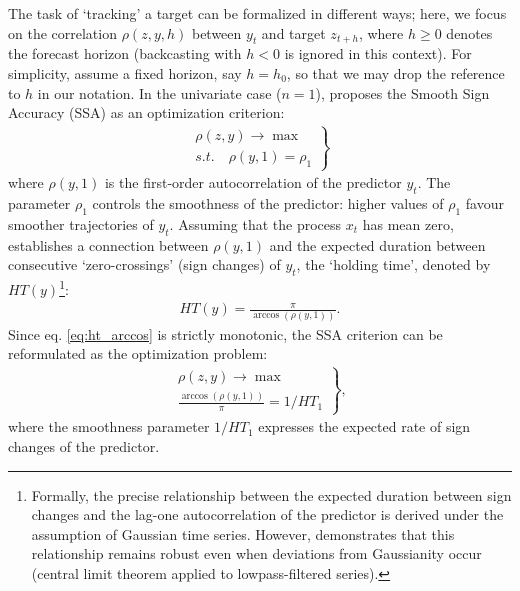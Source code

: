 \documentclass[11pt,a4paper]{article}
\begin{document}
The task of `tracking' a target can be formalized in different ways; here, we focus on the correlation $\rho(z,y,h)$ between $y_t$ and target $z_{t+h}$, where $h\geq 0$ denotes the forecast horizon (backcasting with $h<0$ is ignored in this context). For simplicity, assume a fixed horizon, say $h=h_0$, so that we may drop the reference to $h$ in our notation. In the univariate case ($n=1$), \cite{Wildi2025} proposes the Smooth Sign Accuracy (SSA) as an optimization criterion:
\begin{eqnarray}\label{critssa}
\left.\begin{array}{c}\rho(z,y)\to\max\\
s.t. \quad \rho(y,1)=\rho_1\end{array}\right\}
\end{eqnarray}
where $\rho(y,1)$ is the first-order autocorrelation of the predictor $y_t$. The parameter $\rho_1$ controls the smoothness of the predictor: higher values of $\rho_1$ favour smoother trajectories of $y_t$. Assuming that the process $x_t$ has mean zero, \cite{Wildi2024} establishes a connection between $\rho(y,1)$ and the expected duration between consecutive `zero-crossings' (sign changes) of $y_t$, the `holding time', denoted by $HT(y)$\footnote{Formally, the precise relationship between the expected duration between sign changes and the lag-one autocorrelation of the predictor is derived under the assumption of Gaussian time series. However, \cite{Wildi2024} demonstrates that this relationship remains robust even when deviations from Gaussianity occur (central limit theorem applied to lowpass-filtered series).}:
\begin{eqnarray}\label{ht}
HT(y)=\frac{\pi}{\arccos(\rho(y,1))}.
\label{eq:ht_arccos}
\end{eqnarray}
Since eq. \ref{eq:ht_arccos} is strictly monotonic, the SSA criterion can be reformulated as the optimization problem:
\begin{eqnarray}\label{critssaht}
\left.\begin{array}{c}\rho(z,y)\to\max\\
\frac{\arccos(\rho(y,1))}{\pi}=1/HT_1\end{array}\right\},
\end{eqnarray}
where the smoothness parameter $1/HT_1$ expresses the expected rate of sign changes of the predictor. \\
\end{document}
